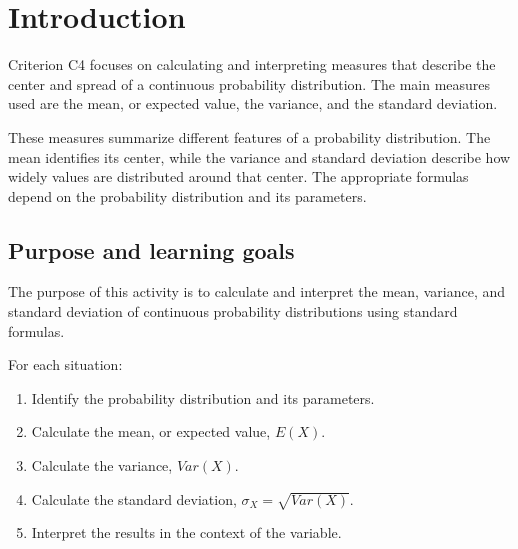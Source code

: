 	\vspace{-4mm}
	
	\section{Introduction}\label{sec:c4-introduction}
	\vspace{8mm}
	
	Criterion C4 focuses on calculating and interpreting measures that describe the
	center and spread of a continuous probability distribution.  The main measures
	used are the mean, or expected value, the variance, and the standard deviation.
	
	These measures summarize different features of a probability distribution.  The
	mean identifies its center, while the variance and standard deviation describe
	how widely values are distributed around that center.  The appropriate formulas
	depend on the probability distribution and its parameters.
	
	\subsection{Purpose and learning goals}\label{sec:c4-intro-purpose}
	The purpose of this activity is to calculate and interpret the mean, variance,
	and standard deviation of continuous probability distributions using standard
	formulas.
	
	For each situation:
	\begin{enumerate}
		\item Identify the probability distribution and its parameters.
		\item Calculate the mean, or expected value, $E(X)$.
		\item Calculate the variance, $Var(X)$.
		\item Calculate the standard deviation,
		$\sigma_X=\sqrt{Var(X)}$.
		\item Interpret the results in the context of the variable.
	\end{enumerate}
	
